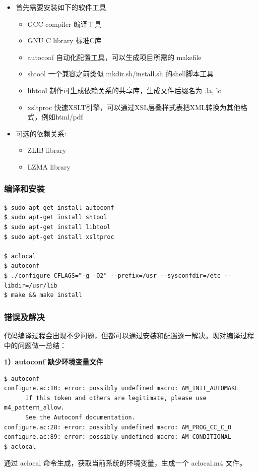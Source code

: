 \documentclass[11pt,a4paper]{article}
\begin{document}
\begin{itemize}
\item
  首先需要安装如下的软件工具
  \begin{itemize}
  \item
    GCC compiler 编译工具
  \item
    GNU C library 标准C库
  \item
    autoconf 自动化配置工具，可以生成项目所需的 makefile
  \item
    shtool 一个兼容之前类似 mkdir.sh/install.sh 的shell脚本工具
  \item
    libtool 制作可生成依赖关系的共享库，生成文件后缀名为 .la, lo
  \item
    xsltproc
    快速XSLT引擎，可以通过XSL层叠样式表把XML转换为其他格式，例如html/pdf
  \end{itemize}
\item
  可选的依赖关系:
  \begin{itemize}
  \item
    ZLIB library
  \item
    LZMA library
  \end{itemize}
\end{itemize}
\subsubsection{编译和安装}

{\begin{shaded}\begin{verbatim}
$ sudo apt-get install autoconf 
$ sudo apt-get install shtool 
$ sudo apt-get install libtool
$ sudo apt-get install xsltproc 

$ aclocal
$ autoconf
$ ./configure CFLAGS="-g -O2" --prefix=/usr --sysconfdir=/etc --libdir=/usr/lib
$ make && make install
\end{verbatim}\end{shaded}}
\subsubsection{错误及解决}

代码编译过程会出现不少问题，但都可以通过安装和配置逐一解决。现对编译过程中的问题做一总结：

\textbf{1）autoconf 缺少环境变量文件}

{\begin{shaded}\begin{verbatim}
$ autoconf 
configure.ac:10: error: possibly undefined macro: AM_INIT_AUTOMAKE
      If this token and others are legitimate, please use m4_pattern_allow.
      See the Autoconf documentation.
configure.ac:28: error: possibly undefined macro: AM_PROG_CC_C_O
configure.ac:89: error: possibly undefined macro: AM_CONDITIONAL
$ aclocal
\end{verbatim}\end{shaded}}
通过 aclocal 命令生成，获取当前系统的环境变量，生成一个 aclocal.m4 文件。
\end{document}
